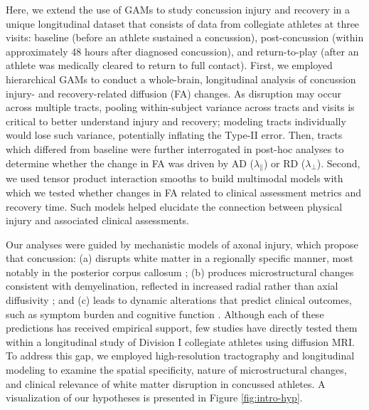 \documentclass[12pt]{article}
\begin{document}
Here, we extend the use of GAMs to study concussion injury and recovery in a unique longitudinal dataset that consists of data from collegiate athletes at three visits: baseline (before an athlete sustained a concussion), post-concussion (within approximately 48 hours after diagnosed concussion), and return-to-play (after an athlete was medically cleared to return to full contact). First, we employed hierarchical GAMs to conduct a whole-brain, longitudinal analysis of concussion injury- and recovery-related diffusion (FA) changes. As disruption may occur across multiple tracts, pooling within-subject variance across tracts and visits is critical to better understand injury and recovery; modeling tracts individually would lose such variance, potentially inflating the Type-II error. Then, tracts which differed from baseline were further interrogated in post-hoc analyses to determine whether the change in FA was driven by AD ($\lambda_\parallel$) or RD ($\lambda_\perp$). Second, we used tensor product interaction smooths to build multimodal models with which we tested whether changes in FA related to clinical assessment metrics and recovery time. Such models helped elucidate the connection between physical injury and associated clinical assessments.

Our analyses were guided by mechanistic models of axonal injury, which propose that concussion: (a) disrupts white matter in a regionally specific manner, most notably in the posterior corpus callosum \autocite{jang2020DiagnosticProblemsDiffuse,johnson2013AxonalPathologyTraumatic,lindsey2023DiffusionWeightedImagingMild,meythaler2001CurrentConceptsDiffuse}; (b) produces microstructural changes consistent with demyelination, reflected in increased radial rather than axial diffusivity \autocite{mayer2017SpectrumMildTraumatic,borja2018DiffusionMRImaging}; and (c) leads to dynamic alterations that predict clinical outcomes, such as symptom burden and cognitive function \autocite{marmarou2007IMPACTDatabaseTraumatic,maas2013AdvancingCareTraumatic,schatz2013SensitivitySpecificityOnline}. Although each of these predictions has received empirical support, few studies have directly tested them within a longitudinal study of Division I collegiate athletes using diffusion MRI. To address this gap, we employed high-resolution tractography and longitudinal modeling to examine the spatial specificity, nature of microstructural changes, and clinical relevance of white matter disruption in concussed athletes. A visualization of our hypotheses is presented in Figure \ref{fig:intro-hyp}.
\end{document}
